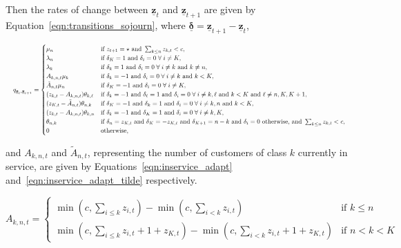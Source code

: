 \documentclass{article}
\begin{document}
Then the rates of change between $\underline{\mathbf{z}}_t$ and
$\underline{\mathbf{z}}_{t+1}$ are given by Equation~\ref{eqn:transitions_sojourn},
where $\underline{\mathbf{\delta}} = \underline{\mathbf{z}}_{t+1} - \underline{\mathbf{z}}_t$,

\begin{equation}\label{eqn:transitions_sojourn}
\resizebox{\textwidth}{!}{%
$q_{\underline{\mathbf{z}}_t, \underline{\mathbf{z}}_{t+1}} = 
\begin{cases}
\mu_n & \text{if } z_{t+1} = \star \text{ and } \sum_{k \leq n} z_{k, t} < c, \\
\lambda_n & \text{if } \delta_K = 1 \text{ and } \delta_i = 0 \; \forall \; i \neq K, \\
\lambda_k & \text{if } \delta_k = 1 \text{ and } \delta_i = 0 \; \forall \; i \neq k \text{ and } k \neq n,\\
A_{k,n,t} \mu_k & \text{if } \delta_k = -1 \text{ and } \delta_i = 0 \; \forall \; i \neq k \text{ and } k < K,\\
\tilde{A}_{n,t} \mu_n & \text{if } \delta_K = -1 \text{ and } \delta_i = 0 \; \forall \; i \neq K,\\
(z_{k,t} - A_{k,n,t}) \theta_{k,\ell} & \text{if } \delta_{k} = -1 \text{ and } \delta_{\ell} = 1 \text{ and } \delta_i = 0 \; \forall \; i \neq k, \ell \text{ and } k < K \text{ and } \ell \neq n, K, K+1, \\
(z_{K,t} - \tilde{A}_{n,t}) \theta_{n,k} & \text{if } \delta_K = -1 \text{ and } \delta_{k} = 1 \text{ and } \delta_i = 0 \; \forall \; i \neq k, n \text{ and } k < K, \\
(z_{k,t} - A_{k,n,t}) \theta_{k,n} & \text{if } \delta_k = -1 \text{ and } \delta_K = 1 \text{ and } \delta_i = 0 \; \forall \; i \neq k, K, \\
\theta_{n, k} & \text{if } \delta_n = z_{K,t} \text{ and } \delta_K = -z_{K,t} \text{ and } \delta_{K+1} = n - k \text{ and } \delta_i = 0 \text{ otherwise, and } \sum_{k \leq n} z_{k, t} < c, \\
0 & \text{otherwise,}
\end{cases}$%
}
\end{equation}

and $A_{k,n,t}$ and $\tilde{A}_{n, t}$, representing the number of customers of
class $k$ currently in service, are given by Equations~\ref{eqn:inservice_adapt}
and~\ref{eqn:inservice_adapt_tilde} respectively.

\begin{equation}\label{eqn:inservice_adapt}
A_{k,n,t} =
\begin{cases}
\min\left(c, \sum_{i \leq k} z_{i,t}\right) - \min\left(c, \sum_{i < k} z_{i,t}\right) & \text{if } k \leq n \\
\min\left(c, \sum_{i \leq k} z_{i,t} + 1 + z_{K,t}\right) - \min\left(c, \sum_{i < k} z_{i,t} + 1 + z_{K,t}\right) & \text{if } n < k < K
\end{cases}
\end{equation}
\end{document}

